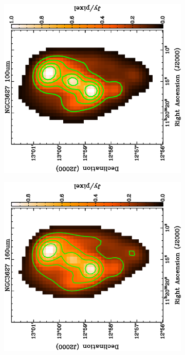 \begin{figure}
  \begin{subfigure}[t]{0.48\textwidth}
    \centering
    \includegraphics[width=1.\linewidth, angle=270]{sed_imgs/100_sed.eps}
  \end{subfigure}
  \quad
  \begin{subfigure}[t]{0.48\textwidth}
    \centering
    \includegraphics[width=1.\linewidth, angle=270]{sed_imgs/160_sed.eps}
  \end{subfigure}
  

\end{figure}
